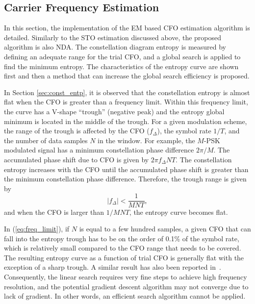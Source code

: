 \documentclass[12pt, draftclsnofoot, onecolumn]{IEEEtran}
\begin{document}
\subsection{Carrier Frequency Estimation}
\label{sec:carrier_recovery}
In this section, the implementation of the EM based CFO estimation algorithm is detailed.
Similarly to the STO estimation discussed above, the proposed algorithm is also NDA.
The constellation diagram entropy is measured by defining an adequate range for the trial CFO, and a global search is applied to find the minimum entropy. 
The characteristics of the entropy curve are shown first and then a method that can increase the global search efficiency is proposed. 

In Section \ref{sec:const_entp}, it is observed that the constellation entropy is almost flat when the CFO is greater than a frequency limit.
Within this frequency limit, the curve has a V-shape ``trough'' (negative peak) and the entropy global minimum is located in the middle of the trough.
For a given modulation scheme, the range of the trough is affected by the CFO ($f_\Delta$), the symbol rate $1/T$, and the number of data samples $N$ in the window.
For example, the \(M\)-PSK modulated signal has a minimum constellation phase difference \(2\pi/M\).
The accumulated phase shift due to CFO is given by \(2\pi f_\Delta N T\).
The constellation entropy increases with the CFO until the accumulated phase shift is greater than the minimum constellation phase difference. 
Therefore, the trough range is given by
\begin{equation}
\left| {f_\Delta } \right| < \frac{1}{{MNT}},
\label{eq:freq_limit}
\end{equation}
\noindent and when the CFO is larger than $1/MNT$, the entropy curve becomes flat.


In (\ref{eq:freq_limit}), if \(N\) is equal to a few hundred samples, a given CFO that can fall into the entropy trough has to be on the order of 0.1\% of the symbol rate, which is relatively small compared to the CFO range that needs to be covered.
The resulting entropy curve as a function of trial CFO is generally flat with the exception of a sharp trough.
A similar result has also been reported in~\cite{Pedzisz2006}. 
Consequently, the linear search requires very fine steps to achieve high frequency resolution, and the potential gradient descent algorithm may not converge due to lack of gradient.
In other words, an efficient search algorithm cannot be applied. 
\end{document}
